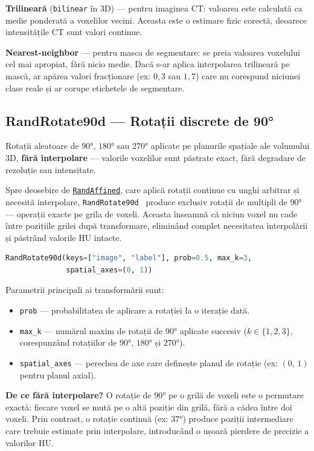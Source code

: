 \documentclass[12pt, a4paper]{report}
\begin{document}
\textbf{Trilineară} (\texttt{bilinear} în 3D) — pentru imaginea CT:
valoarea este calculată ca medie ponderată a voxelilor vecini.
Aceasta este o estimare fizic corectă, deoarece intensitățile CT
sunt valori continue.

\textbf{Nearest-neighbor} — pentru masca de segmentare: se preia
valoarea voxelului cel mai apropiat, fără nicio medie. Dacă s-ar
aplica interpolarea trilineară pe mască, ar apărea valori
fracționare (ex: $0{,}3$ sau $1{,}7$) care nu corespund niciunei
clase reale și ar corupe etichetele de segmentare.

\subsection{RandRotate90d — Rotații discrete de 90°}
\label{sec:randrotate90}

\vspace{4pt}
\begin{infobox}
Rotații aleatoare de $90°$, $180°$ sau $270°$ aplicate pe planurile
spațiale ale volumului 3D, \textbf{fără interpolare} — valorile
voxelilor sunt păstrate exact, fără degradare de rezoluție sau
intensitate.
\end{infobox}

Spre deosebire de \hyperref[sec:randaffine]{\texttt{RandAffined}},
care aplică rotații continue cu unghi arbitrar și necesită
interpolare, \texttt{RandRotate90d}~\cite{cardoso2022monai} produce exclusiv rotații de
multipli de $90°$ — operații exacte pe grila de voxeli.
Aceasta înseamnă că niciun voxel nu cade între pozițiile grilei
după transformare, eliminând complet necesitatea interpolării și
păstrând valorile HU intacte.

\begin{lstlisting}[language=Python]
RandRotate90d(keys=["image", "label"], prob=0.5, max_k=3,
              spatial_axes=(0, 1))
\end{lstlisting}

Parametrii principali ai transformării sunt:
\begin{itemize}
    \item \texttt{prob} — probabilitatea de aplicare a rotației
          la o iterație dată.
    \item \texttt{max\_k} — numărul maxim de rotații de $90°$
          aplicate succesiv ($k \in \{1, 2, 3\}$, corespunzând
          rotațiilor de $90°$, $180°$ și $270°$).
    \item \texttt{spatial\_axes} — perechea de axe care definește
          planul de rotație (ex: $(0,\,1)$ pentru planul axial).
\end{itemize}
\textbf{De ce fără interpolare?}
O rotație de $90°$ pe o grilă de voxeli este o permutare exactă:
fiecare voxel se mută pe o altă poziție din grilă, fără a cădea
între doi voxeli. Prin contrast, o rotație continuă (ex: $37°$)
produce poziții intermediare care trebuie estimate prin interpolare,
introducând o ușoară pierdere de precizie a valorilor HU.
\end{document}
